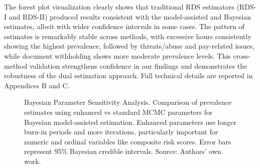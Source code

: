 \documentclass[
  12pt,
  letterpaper,
  DIV=11,
  numbers=noendperiod]{scrartcl}
\theoremstyle{plain}
\theoremstyle{definition}
\begin{document}
The forest plot visualization clearly shows that traditional RDS
estimators (RDS-I and RDS-II) produced results consistent with the
model-assisted and Bayesian estimates, albeit with wider confidence
intervals in some cases. The pattern of estimates is remarkably stable
across methods, with excessive hours consistently showing the highest
prevalence, followed by threats/abuse and pay-related issues, while
document withholding shows more moderate prevalence levels. This
cross-method validation strengthens confidence in our findings and
demonstrates the robustness of the dual estimation approach. Full
technical details are reported in Appendices B and C.

\begin{figure}[H]


\caption{\label{fig-parameter-comparison}Bayesian Parameter Sensitivity
Analysis. Comparison of prevalence estimates using enhanced vs standard
MCMC parameters for Bayesian model-assisted estimation. Enhanced
parameters use longer burn-in periods and more iterations, particularly
important for numeric and ordinal variables like composite risk scores.
Error bars represent 95\% Bayesian credible intervals. Source: Authors'
own work.}

\end{figure}%
\end{document}
